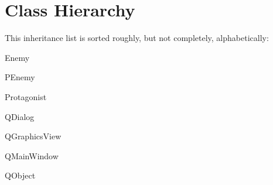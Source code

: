 \section{Class Hierarchy}
This inheritance list is sorted roughly, but not completely, alphabetically\+:\begin{DoxyCompactList}
\item {}
\item Enemy\begin{DoxyCompactList}
\item {}
\end{DoxyCompactList}
\item {}
\item {}
\item P\+Enemy\begin{DoxyCompactList}
\item {}
\end{DoxyCompactList}
\item Protagonist\begin{DoxyCompactList}
\item {}
\end{DoxyCompactList}
\item Q\+Dialog\begin{DoxyCompactList}
\item {}
\end{DoxyCompactList}
\item Q\+Graphics\+View\begin{DoxyCompactList}
\item {}
\end{DoxyCompactList}
\item Q\+Main\+Window\begin{DoxyCompactList}
\item {}
\end{DoxyCompactList}
\item Q\+Object\begin{DoxyCompactList}
\item {}

\end{DoxyCompactList}
\end{DoxyCompactList}
